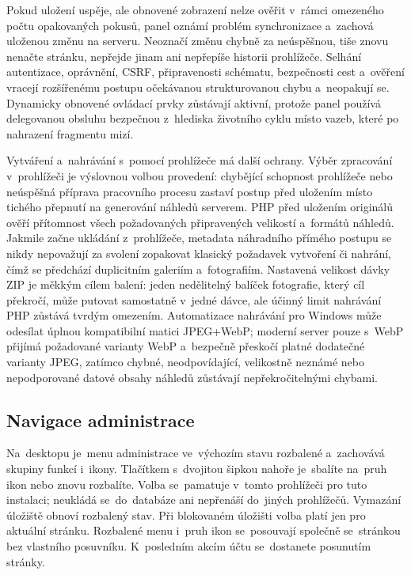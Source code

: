 \documentclass[11pt,a4paper]{article}
\begin{document}
Pokud uložení uspěje, ale obnovené zobrazení nelze ověřit v~rámci omezeného
počtu opakovaných pokusů, panel oznámí problém synchronizace a~zachová uloženou
změnu na serveru. Neoznačí změnu chybně za neúspěšnou, tiše znovu nenačte
stránku, nepřejde jinam ani nepřepíše historii prohlížeče. Selhání autentizace,
oprávnění, CSRF, připravenosti schématu, bezpečnosti cest a~ověření vracejí
rozšířenému postupu očekávanou strukturovanou chybu a~neopakují se. Dynamicky
obnovené ovládací prvky zůstávají aktivní, protože panel používá delegovanou
obsluhu bezpečnou z~hlediska životního cyklu místo vazeb, které po nahrazení
fragmentu mizí.

Vytváření a~nahrávání s~pomocí prohlížeče má další ochrany. Výběr zpracování
v~prohlížeči je výslovnou volbou provedení: chybějící schopnost prohlížeče nebo
neúspěšná příprava pracovního procesu zastaví postup před uložením místo tichého
přepnutí na generování náhledů serverem. PHP před uložením originálů ověří
přítomnost všech požadovaných připravených velikostí a~formátů náhledů. Jakmile
začne ukládání z~prohlížeče, metadata náhradního přímého postupu se nikdy
nepovažují za svolení zopakovat klasický požadavek vytvoření či nahrání, čímž se
předchází duplicitním galeriím a~fotografiím. Nastavená velikost dávky ZIP je
měkkým cílem balení: jeden nedělitelný balíček fotografie, který cíl překročí,
může putovat samostatně v~jedné dávce, ale účinný limit nahrávání PHP zůstává
tvrdým omezením. Automatizace nahrávání pro Windows může odesílat úplnou
kompatibilní matici JPEG+WebP; moderní server pouze s~WebP přijímá požadované
varianty WebP a~bezpečně přeskočí platné dodatečné varianty JPEG, zatímco
chybné, neodpovídající, velikostně neznámé nebo nepodporované datové obsahy
náhledů zůstávají nepřekročitelnými chybami.

\subsection{Navigace administrace}

Na~desktopu je~menu administrace ve~výchozím stavu rozbalené a~zachovává skupiny
funkcí i~ikony. Tlačítkem s~dvojitou šipkou nahoře je~sbalíte na~pruh ikon nebo
znovu rozbalíte. Volba se~pamatuje v~tomto prohlížeči pro tuto instalaci;
neukládá se~do~databáze ani nepřenáší do~jiných prohlížečů. Vymazání úložiště
obnoví rozbalený stav. Při blokovaném úložišti volba platí jen pro aktuální
stránku. Rozbalené menu i~pruh ikon se~posouvají společně se~stránkou bez
vlastního posuvníku. K~posledním akcím účtu se~dostanete posunutím stránky.
\end{document}
